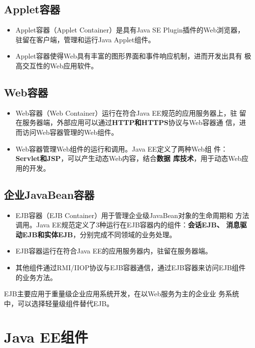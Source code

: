 \subsection{Applet容器} 

\begin{itemize}
\item Applet容器（Applet Container）是具有Java SE Plugin插件的Web浏览器，
  驻留在客户端，管理和运行Java Applet组件。
\item Applet容器使得Web具有丰富的图形界面和事件响应机制，进而开发出具有
  极高交互性的Web应用软件。
\end{itemize}

\subsection{Web容器} 

\begin{itemize}
\item Web容器（Web Container）运行在符合Java EE规范的应用服务器上，驻
  留在服务器端，外部应用可以通过{\bf\Blue HTTP和HTTPS}协议与Web容器通
  信，进而访问Web容器管理的Web组件。
\item Web容器管理Web组件的运行和调用。Java EE定义了两种Web组
  件：{\bf\Blue Servlet和JSP}，可以产生动态Web内容，结合{\bf\Blue 数据
    库技术}，用于动态Web应用的开发。
\end{itemize}

\subsection{企业JavaBean容器}
  
\begin{itemize}
\item EJB容器（EJB Container）用于管理企业级JavaBean对象的生命周期和
  方法调用。Java EE规范定义了3种运行在EJB容器内的组件：{\bf\Red 会话EJB、
    消息驱动EJB和实体EJB}，分别完成不同领域的业务处理。
\item EJB容器运行在符合Java EE的应用服务器内，驻留在服务器端。
\item 其他组件通过RMI/IIOP协议与EJB容器通信，通过EJB容器来访问EJB组件
  的业务方法。
\end{itemize}

{\kai\Red EJB主要应用于重量级企业应用系统开发，在以Web服务为主的企业业
  务系统中，可以选择轻量级组件替代EJB。}

\section{Java EE组件}


